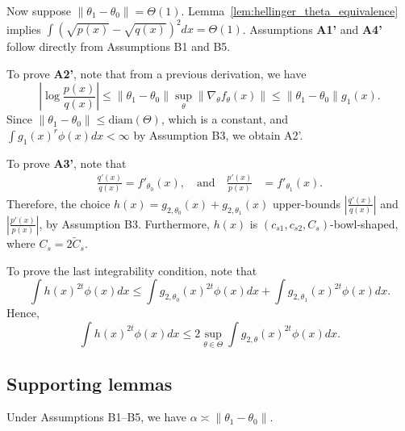 \documentclass{article}
\begin{document}
Now suppose $\| \theta_1 - \theta_0 \| = \Theta(1)$. Lemma~\ref{lem:hellinger_theta_equivalence} implies $\int (\sqrt{p(x)} - \sqrt{q(x)})^2 dx = \Theta(1)$. Assumptions \textbf{A1'} and \textbf{A4'} follow directly from Assumptions B1 and B5. 

To prove \textbf{A2'}, note that from a previous derivation, we have
\[
\left | \log \frac{p(x)}{q(x)} \right | 
                \leq  \| \theta_1 - \theta_0 \| \sup_\theta \| \nabla_{\theta} f_{\theta} (x) \| \leq 
     \| \theta_1 - \theta_0 \| g_1(x).
\]
Since $\|\theta_1 - \theta_0\| \leq \textrm{diam}(\Theta)$, which is a constant, and $\int g_1(x)^r \phi(x) dx < \infty$ by Assumption B3, we obtain A2'.

To prove \textbf{A3'}, note that
\begin{align*}
\frac{q'(x)}{q(x)} = f'_{\theta_0}(x), \quad \text{and} \quad \frac{p'(x)}{p(x)} &= f'_{\theta_1}(x).
\end{align*}
Therefore, the choice $h(x) = g_{2, \theta_0}(x) + g_{2, \theta_1}(x)$ upper-bounds $\left| \frac{q'(x)}{q(x)} \right|$ and 
$\left| \frac{p'(x)}{p(x)} \right|$, by Assumption B3. Furthermore, $h(x)$ is $(c_{s1}, c_{s2}, C_s)$-bowl-shaped, where $C_s = 2 \tilde{C}_s$. 

To prove the last integrability condition, note that
\[
 \int h(x)^{2t} \phi(x) dx \leq \int g_{2, \theta_0}(x)^{2t} \phi(x) dx  + \int g_{2, \theta_1}(x)^{2t} \phi(x) dx.
\]
Hence, 
\[
\int h(x)^{2t} \phi(x) dx \leq 2 \sup_{\theta \in \Theta} \int g_{2, \theta}(x)^{2t} \phi(x) dx.
\]



\subsection{Supporting lemmas}

\begin{lemma}
\label{lem:chi_square_theta_equivalence}
Under Assumptions B1--B5, we have
$\alpha \asymp \| \theta_1 - \theta_0 \|$.
\end{lemma}
\end{document}
